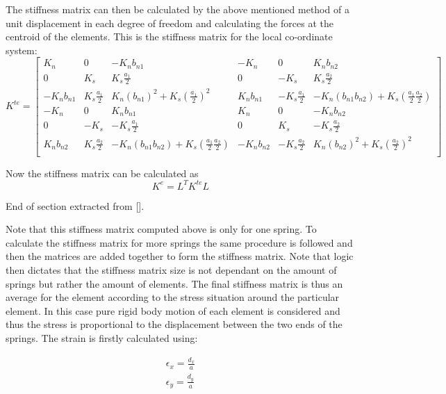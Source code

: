 The stiffness matrix can then be calculated by the above mentioned method of a unit displacement in each degree of freedom and calculating the forces at the centroid of the elements. 
This is the stiffness matrix for the local co-ordinate system:
\begin{equation}
K^{te} = 
\begin{bmatrix}
K_n & 0 & -K_n b_{n1} & -K_n & 0 & K_n b_{n2} \\

0 & K_s & K_s \frac{a_1}{2} & 0 & -K_s & K_s \frac{a_2}{2} \\

-K_n b_{n1} & K_s \frac{a_1}{2} & K_n (b_{n1})^2 + K_s (\frac{a_1}{2})^2 & K_n b_{n1} & -K_s \frac{a_1}{2} & -K_n (b_{n1} b_{n2}) + K_s (\frac{a_1}{2} \frac{a_2}{2}) \\

-K_n & 0 & K_n b_{n1} & K_n & 0 & -K_n b_{n2}  \\

0 & -K_s & -K_s \frac{a_1}{2}& 0 & K_s & -K_s \frac{a_2}{2} \\

K_n b_{n2} & K_s \frac{a_2}{2} & -K_n (b_{n1} b_{n2}) + K_s (\frac{a_1}{2} \frac{a_2}{2}) & -K_n b_{n2} & -K_s \frac{a_2}{2} & K_n (b_{n2})^2 + K_s (\frac{a_2}{2})^2 \\
\end{bmatrix}
\label{eq:Kte matrix}
\end{equation}

Now the stiffness matrix can be calculated as 
\begin{equation}
K^e = L^T K^{te} L
\end{equation}

End of section extracted from [\cite{Blog_python_AEM}].

Note that this stiffness matrix computed above is only for one spring.  To calculate the stiffness matrix for more springs the same procedure is followed and then the matrices are added together to form the stiffness matrix.  Note that logic then dictates that the stiffness matrix size is not dependant on the amount of springs but rather the amount of elements.  The final stiffness matrix is thus an average for the element according to the stress situation around the particular element.  In this case pure rigid body motion of each element is considered and thus the stress is proportional to the displacement between the two ends of the springs.  The strain is firstly calculated using:

\begin{eqnarray}
\epsilon_x = \frac{d_x}{a} \\
\epsilon_y = \frac{d_y}{a} 
\end{eqnarray}


